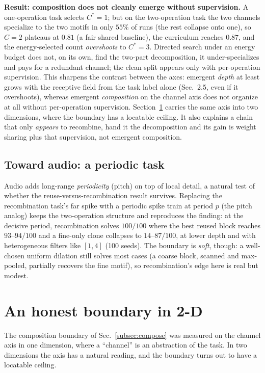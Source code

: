 \documentclass[11pt]{article}
\begin{document}
\textbf{Result: composition does not cleanly emerge without supervision.} A one-operation task selects
$C^\ast{=}1$; but on the two-operation task the two channels specialize to the two motifs in only $55\%$ of
runs (the rest collapse onto one), so $C{=}2$ plateaus at $0.81$ (a fair shared baseline), the curriculum
reaches $0.87$, and the energy-selected count \emph{overshoots} to $C^\ast{=}3$. Directed search under an
energy budget does not, on its own, find the two-part decomposition, it under-specializes and pays for a
redundant channel; the clean split appears only with per-operation supervision. This sharpens the contrast
between the axes: emergent \emph{depth} at least grows with the receptive field from the task label alone
(Sec.~2.5, even if it overshoots), whereas emergent \emph{composition} on the channel axis does not
organize at all without per-operation supervision. Section~\ref{sec:twod} carries the same axis into two dimensions, where the boundary has a
locatable ceiling. It also explains a chain
that only \emph{appears} to recombine, hand it the decomposition and its gain is weight sharing plus that
supervision, not emergent composition.

\subsection{Toward audio: a periodic task}\label{subsec:audio}

Audio adds long-range \emph{periodicity} (pitch) on top of local detail, a natural test of whether the
reuse-versus-recombination result survives. Replacing the recombination task's far spike with a periodic
spike train at period $p$ (the pitch analog) keeps the two-operation structure and reproduces the finding: at the decisive
period, recombination solves $100/100$ where the best reused block reaches $93$--$94/100$ and a fine-only
clone collapses to $14$--$87/100$, at lower depth and with heterogeneous filters like $[1,4]$ (100 seeds).
The boundary is \emph{soft}, though: a well-chosen uniform dilation still solves most cases (a coarse block,
scanned and max-pooled, partially recovers the fine motif), so recombination's edge here is real but modest.

\section{An honest boundary in 2-D}\label{sec:twod}

The composition boundary of Sec.~\ref{subsec:compose} was measured on the channel axis in one
dimension, where a ``channel'' is an abstraction of the task. In two dimensions the axis has a
natural reading, and the boundary turns out to have a locatable ceiling.
\end{document}
